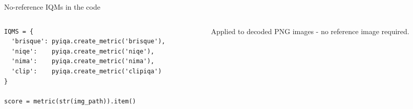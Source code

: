 \documentclass[aspectratio=169,10pt]{beamer}
\newcommand{\smallmuted}[1]{{\color{IQMmuted}\footnotesize #1}}
\begin{document}
\begin{frame}[fragile]{No-reference IQMs in the code}
\begin{columns}[T,onlytextwidth]
\begin{column}{0.52\textwidth}
\begin{lstlisting}[style=py]
IQMS = {
  'brisque': pyiqa.create_metric('brisque'),
  'niqe':    pyiqa.create_metric('niqe'),
  'nima':    pyiqa.create_metric('nima'),
  'clip':    pyiqa.create_metric('clipiqa')
}

score = metric(str(img_path)).item()
\end{lstlisting}
\end{column}
\begin{column}{0.44\textwidth}
\vspace{0.18cm}
\smallmuted{Applied to decoded PNG images - no reference image required.}
\end{column}
\end{columns}
\end{frame}
\end{document}
